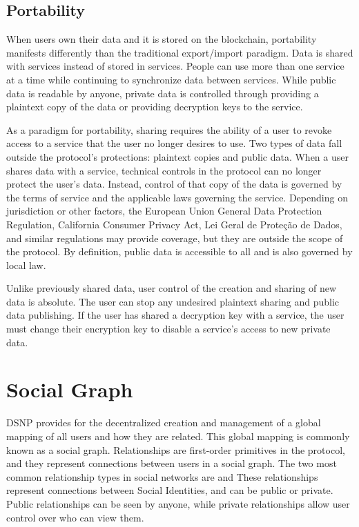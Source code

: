 \documentclass[12pt,letterpaper]{article}
\begin{document}
\subsection{Portability}\label{sec:portability}

When users own their data and it is stored on the blockchain, portability manifests
differently than the traditional export/import paradigm. Data is shared with services
instead of stored in services. People can use more than one service at a time while
continuing to synchronize data between services. While public data is readable by anyone,
private data is controlled through providing a plaintext copy of the data or providing
decryption keys to the service.

As a paradigm for portability, sharing requires the ability of a user to revoke access to
a service that the user no longer desires to use. Two types of data fall outside the
protocol's protections: plaintext copies and public data. When a user shares data with a
service, technical controls in the protocol can no longer protect the user's data.
Instead, control of that copy of the data is governed by the terms of service and the
applicable laws governing the service. Depending on jurisdiction or other factors, the
European Union General Data Protection Regulation,\cite{gdpr2016} California Consumer
Privacy Act,\cite{ccpa2018} Lei Geral de Proteção de Dados,\cite{lgpd2019} and similar
regulations may provide coverage, but they are outside the scope of the protocol. By
definition, public data is accessible to all and is also governed by local law.

Unlike previously shared data, user control of the creation and sharing of new data is
absolute. The user can stop any undesired plaintext sharing and public data publishing. If
the user has shared a decryption key with a service, the user must change their encryption
key to disable a service's access to new private data.

\section{Social Graph}\label{sec:social_graph}

DSNP provides for the decentralized creation and management of a global mapping of all
users and how they are related. This global mapping is commonly known as a social graph.
Relationships are first-order primitives in the protocol, and they represent connections
between users in a social graph. The two most common relationship types in social networks
are  and  These relationships represent connections between
Social Identities, and can be public or private. Public relationships can be seen by
anyone, while private relationships allow user control over who can view them.
\end{document}
